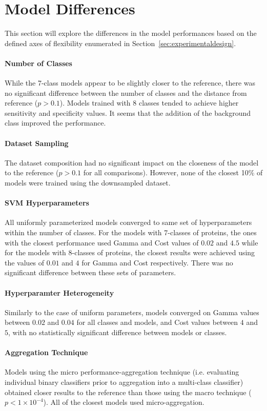 \section{Model Differences}
This section will explore the differences in the model performances based on the defined axes of
flexibility enumerated in Section~\ref{sec:experimentaldesign}.

\paragraph{Number of Classes}
While the 7-class models appear to be slightly closer to the reference, there was no significant difference between
the number of classes and the distance from reference ($p > 0.1$). Models trained with 8 classes tended to achieve
higher sensitivity and specificity values. It seems that the addition of the background class improved the 
performance.

\paragraph{Dataset Sampling}
The dataset composition had no significant impact on the closeness of the model to the reference ($p > 0.1$ for all
comparisons). However, none of the closest 10\% of models were trained using the downsampled dataset.

\paragraph{SVM Hyperparameters}
All uniformly parameterized models converged to same set of hyperparameters within the number of classes. For the 
models with 7-classes of proteins, the ones with the closest performance used Gamma and Cost 
values of $0.02$ and $4.5$ while for the models with 8-classes of proteins, the closest results were achieved using 
the values of $0.01$ and $4$ for Gamma and Cost respectively. There was no significant difference between these 
sets of parameters.

\paragraph{Hyperparamter Heterogeneity}
Similarly to the case of uniform parameters, models converged on Gamma values between $0.02$ and $0.04$ for all classes
and models, and Cost values between $4$ and $5$, with no statistically significant difference between models or classes.

\paragraph{Aggregation Technique}
Models using the micro performance-aggregation technique (i.e. evaluating individual binary classifiers prior to
aggregation into a multi-class classifier) obtained closer results to the reference than those using the macro
technique ($p < 1\times 10^{-4}$). All of the closest models used micro-aggregation.


